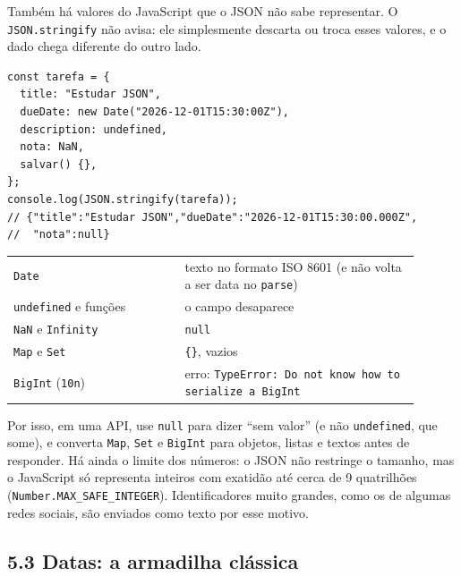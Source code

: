 Também há valores do JavaScript que o JSON não sabe representar. O \texttt{JSON.stringify} não avisa: ele simplesmente descarta ou troca esses valores, e o dado chega diferente do outro lado.

\begin{codigo}
\begin{Verbatim}[breaklines=true, breaksymbolleft={}, fontsize=\footnotesize]
const tarefa = {
  title: "Estudar JSON",
  dueDate: new Date("2026-12-01T15:30:00Z"),
  description: undefined,
  nota: NaN,
  salvar() {},
};
console.log(JSON.stringify(tarefa));
// {"title":"Estudar JSON","dueDate":"2026-12-01T15:30:00.000Z",
//  "nota":null}
\end{Verbatim}
\end{codigo}

\begin{center}
\begin{tabular}{@{}P{0.38\linewidth}P{0.52\linewidth}@{}}
\toprule
{}
 &  \\
\midrule
\texttt{Date} & texto no formato ISO 8601 (e não volta a ser data no \texttt{parse}) \\
 \texttt{undefined} e funções & o campo desaparece \\
\texttt{NaN} e \texttt{Infinity} & \texttt{null} \\
 \texttt{Map} e \texttt{Set} & \texttt{\{\}}, vazios \\
\texttt{BigInt} (\texttt{10n}) & erro: \texttt{TypeError: Do not know how to serialize a BigInt} \\
\bottomrule
\end{tabular}
\end{center}

Por isso, em uma API, use \texttt{null} para dizer ``sem valor'' (e não \texttt{undefined}, que some), e converta \texttt{Map}, \texttt{Set} e \texttt{BigInt} para objetos, listas e textos antes de responder. Há ainda o limite dos números: o JSON não restringe o tamanho, mas o JavaScript só representa inteiros com exatidão até cerca de 9 quatrilhões (\texttt{Number.MAX\_SAFE\_INTEGER}). Identificadores muito grandes, como os de algumas redes sociais, são enviados como texto por esse motivo.

\subsection{5.3 Datas: a armadilha clássica}


